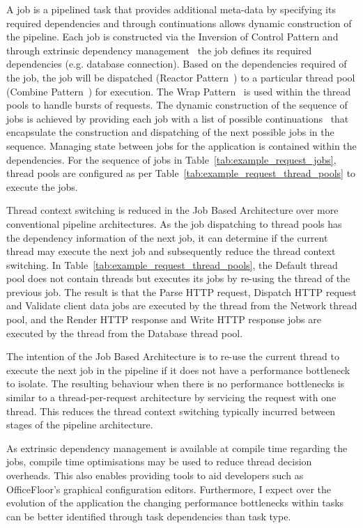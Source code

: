 \documentclass[conference]{ieee/IEEEtran}
\begin{document}
A job is a pipelined task that provides additional meta-data by specifying its
required dependencies and through continuations allows dynamic construction of
the pipeline.  Each job is constructed via the Inversion of Control Pattern and
through extrinsic dependency management~\cite{ioc} the job defines its required
dependencies (e.g. database connection).  Based on the dependencies required of
the job, the job will be dispatched (Reactor Pattern~\cite{reactor}) to a
particular thread pool (Combine Pattern~\cite{pipeline}) for execution.
The Wrap Pattern~\cite{pipeline} is used within the thread pools to handle
bursts of requests.  The dynamic construction of the sequence of jobs is
achieved by providing each job with a list of possible
continuations~\cite{continuations} that encapsulate the construction and
dispatching of the next possible jobs in the sequence. Managing state between
jobs for the application is contained within the dependencies.  For the sequence
of jobs in Table~\ref{tab:example_request_jobs}, thread pools are configured as
per Table~\ref{tab:example_request_thread_pools} to execute the jobs.

Thread context switching is reduced in the Job Based Architecture over more
conventional pipeline architectures.  As the job dispatching to thread pools has
the dependency information of the next job, it can determine if the current
thread may execute the next job and subsequently reduce the thread context
switching.  In Table~\ref{tab:example_request_thread_pools}, the Default thread
pool does not contain threads but executes its jobs by re-using the thread of
the previous job.  The result is that the Parse HTTP request, Dispatch HTTP
request and Validate client data jobs are executed by the thread from the
Network thread pool, and the Render HTTP response and Write HTTP response jobs
are executed by the thread from the Database thread pool.

The intention of the Job Based Architecture is to re-use the current thread to
execute the next job in the pipeline if it does not have a performance
bottleneck to isolate.  The resulting behaviour when there is no performance
bottlenecks is similar to a thread-per-request architecture by servicing the
request with one thread.  This reduces the thread context switching typically
incurred between stages of the pipeline architecture.

As extrinsic dependency management is available at compile time regarding the
jobs, compile time optimisations may be used to reduce thread decision
overheads.  This also enables providing tools to aid developers such as
OfficeFloor's graphical configuration editors.  Furthermore,  I expect over the
evolution of the application the changing performance bottlenecks within tasks
can be better identified through task dependencies than task type.
\end{document}
